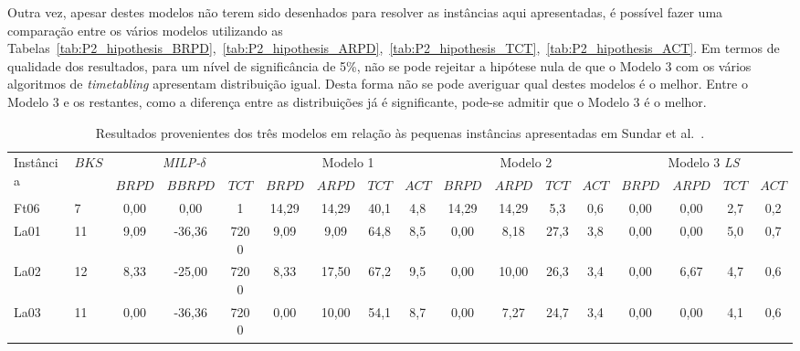 Outra vez, apesar destes modelos não terem sido desenhados para resolver as instâncias aqui apresentadas, é possível fazer uma comparação entre os vários modelos utilizando as Tabelas~\ref{tab:P2_hipothesis_BRPD},~\ref{tab:P2_hipothesis_ARPD},~\ref{tab:P2_hipothesis_TCT},~\ref{tab:P2_hipothesis_ACT}. Em termos de qualidade dos resultados, para um nível de significância de 5\%, não se pode rejeitar a hipótese nula de que o Modelo 3 com os vários algoritmos de \textit{timetabling} apresentam distribuição igual. Desta forma não se pode averiguar qual destes modelos é o melhor. Entre o Modelo 3 e os restantes, como a diferença entre as distribuições já é significante, pode-se admitir que o Modelo 3 é o melhor.\\
\begin{landscape}
\begin{table}[H]
\caption{Resultados provenientes dos três modelos em relação às pequenas instâncias apresentadas em Sundar et al.~\cite{sundarHybridArtificialBee2017}.}
\label{tab:P2_instan}
\setlength{\tabcolsep}{3pt} %
\begin{tabular}{ll|ccc|cccc|cccc|cccc}
\multirow{2}{*}{Instância} & \multirow{2}{*}{$BKS$} & \multicolumn{3}{c|}{\textit{MILP-$\delta$}}  & \multicolumn{4}{c|}{Modelo 1}   & \multicolumn{4}{c|}{Modelo 2}    & \multicolumn{4}{c}{Modelo 3 \textit{LS}} \\
                           &                        & $BRPD$ & $BBRPD$ & $TCT$   & $BRPD$ & $ARPD$ & $TCT$ & $ACT$ & $BRPD$ & $ARPD$ & $TCT$  & $ACT$ & $BRPD$        & $ARPD$        & $TCT$       & $ACT$       \\ \hline
Ft06                       & 7                      & 0,00   & 0,00    & 1       & 14,29  & 14,29  & 40,1  & 4,8   & 14,29  & 14,29  & 5,3    & 0,6   & 0,00          & 0,00          & 2,7         & 0,2         \\
La01                       & 11                     & 9,09   & -36,36  & 7200    & 9,09   & 9,09   & 64,8  & 8,5   & 0,00   & 8,18   & 27,3   & 3,8   & 0,00          & 0,00          & 5,0         & 0,7         \\
La02                       & 12                     & 8,33   & -25,00  & 7200    & 8,33   & 17,50  & 67,2  & 9,5   & 0,00   & 10,00  & 26,3   & 3,4   & 0,00          & 6,67          & 4,7         & 0,6         \\
La03                       & 11                     & 0,00   & -36,36  & 7200    & 0,00   & 10,00  & 54,1  & 8,7   & 0,00   & 7,27   & 24,7   & 3,4   & 0,00          & 0,00          & 4,1         & 0,6         \\

\end{tabular}
\end{table}
\end{landscape}
